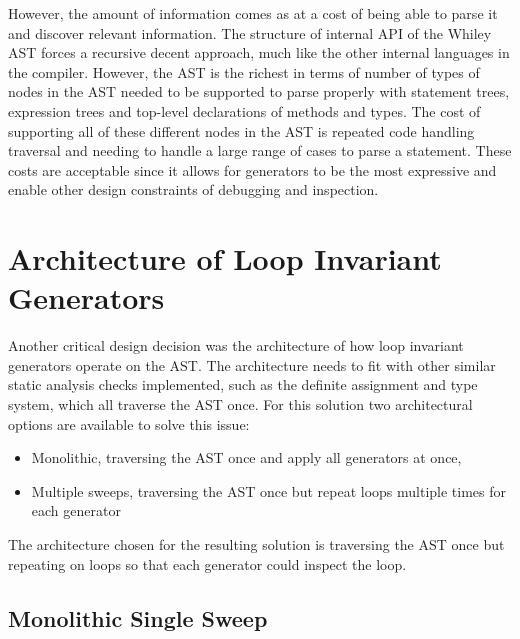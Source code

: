 However, the amount of information comes as at a cost of being able to parse
it and discover relevant information.
The structure of internal API of the Whiley AST forces a recursive decent
approach, much like the other internal languages in the compiler.
However, the AST is the richest in terms of number of types of nodes
in the AST needed to be supported to parse properly with
statement trees, expression trees and top-level declarations of methods and
types.
The cost of supporting all of these different nodes in the AST is
repeated code handling traversal and needing to handle a large range
of cases to parse a statement.
These costs are acceptable since it allows for generators to be
the most expressive and enable other design constraints of
debugging and inspection.

\section{Architecture of Loop Invariant Generators}

Another critical design decision was the architecture of how loop invariant
generators operate on the AST.
The architecture needs to fit with other similar static analysis checks
implemented, such as the definite assignment and type system, which all
traverse the AST once.
For this solution two architectural options are available to solve this issue:

\begin{itemize}
    \item{Monolithic, traversing the AST once and apply all generators at once,}
    \item{Multiple sweeps, traversing the AST once but repeat loops multiple times for each generator}
\end{itemize}

The architecture chosen for the resulting solution is  traversing the AST once
but repeating on loops so that each generator could inspect the loop.

\subsection{Monolithic Single Sweep}

